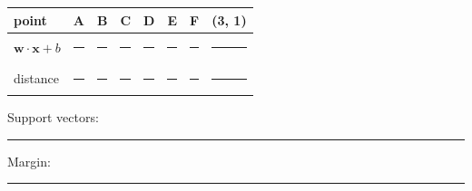 \documentclass[
  11pt,
]{article}
\newcounter{none} %
\newcommand{\answerspace}[1]{\par\vspace*{#1}}  %
\newcommand{\blank}[1][1.2in]{\rule{#1}{0.4pt}}
\begin{document}
{\def\LTcaptype{none} %
\begin{longtable}[]{@{}
  >{\raggedright\arraybackslash}p{}
  >{\raggedright\arraybackslash}p{}
  >{\raggedright\arraybackslash}p{}
  >{\raggedright\arraybackslash}p{}
  >{\raggedright\arraybackslash}p{}
  >{\raggedright\arraybackslash}p{}
  >{\raggedright\arraybackslash}p{}
  >{\raggedright\arraybackslash}p{}@{}}
\toprule\noalign{}
\begin{minipage}[b]{\linewidth}\raggedright
point
\end{minipage} & \begin{minipage}[b]{\linewidth}\raggedright
A
\end{minipage} & \begin{minipage}[b]{\linewidth}\raggedright
B
\end{minipage} & \begin{minipage}[b]{\linewidth}\raggedright
C
\end{minipage} & \begin{minipage}[b]{\linewidth}\raggedright
D
\end{minipage} & \begin{minipage}[b]{\linewidth}\raggedright
E
\end{minipage} & \begin{minipage}[b]{\linewidth}\raggedright
F
\end{minipage} & \begin{minipage}[b]{\linewidth}\raggedright
(3, 1)
\end{minipage} \\
\midrule\noalign{}
\endhead
\bottomrule\noalign{}
\endlastfoot
\(\mathbf{w}\cdot\mathbf{x} + b\) & \blank[0.5in] & \blank[0.5in] &
\blank[0.5in] & \blank[0.5in] & \blank[0.5in] & \blank[0.5in] &
\blank[0.5in] \\
distance & \blank[0.5in] & \blank[0.5in] & \blank[0.5in] & \blank[0.5in]
& \blank[0.5in] & \blank[0.5in] & \blank[0.5in] \\
\end{longtable}
}

Support vectors: \blank[1in]\quad Margin: \blank[0.8in]

\answerspace{2.2in}
\end{document}
